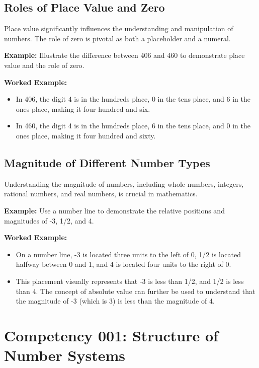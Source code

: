 \documentclass{book}
\begin{document}
\subsection{Roles of Place Value and Zero}
Place value significantly influences the understanding and manipulation of numbers. The role of zero is pivotal as both a placeholder and a numeral.


\textbf{Example:} Illustrate the difference between 406 and 460 to demonstrate place value and the role of zero.


\textbf{Worked Example:}
\begin{itemize}
        \item In 406, the digit 4 is in the hundreds place, 0 in the tens place, and 6 in the ones place, making it four hundred and six.
        \item In 460, the digit 4 is in the hundreds place, 6 in the tens place, and 0 in the ones place, making it four hundred and sixty.
\end{itemize}


\subsection{Magnitude of Different Number Types}
Understanding the magnitude of numbers, including whole numbers, integers, rational numbers, and real numbers, is crucial in mathematics.


\textbf{Example:} Use a number line to demonstrate the relative positions and magnitudes of -3, 1/2, and 4.


\textbf{Worked Example:}
\begin{itemize}
        \item On a number line, -3 is located three units to the left of 0, 1/2 is located halfway between 0 and 1, and 4 is located four units to the right of 0.
        \item This placement visually represents that -3 is less than 1/2, and 1/2 is less than 4. The concept of absolute value can further be used to understand that the magnitude of -3 (which is 3) is less than the magnitude of 4.
\end{itemize}


\section{Competency 001: Structure of Number Systems}
\end{document}
